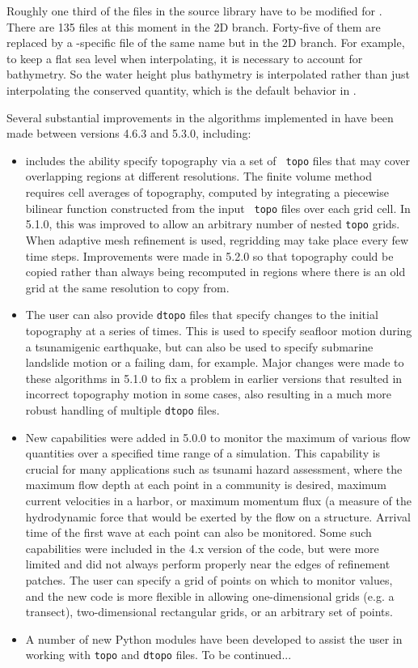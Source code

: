 Roughly one third of the files in the \amrclaw source library
have to be modified for \geoclaw. 
There are 135 files at this moment 
in the \amrclaw 2D branch.
Forty-five of them are replaced by a \geoclaw-specific file of the
same name but in the \geoclaw 2D branch. 
For example, to keep a flat
sea level when interpolating, it is necessary to account for bathymetry.
So the water height plus bathymetry is interpolated rather than just
interpolating the conserved quantity, which is the default behavior in
\amrclaw.

Several substantial improvements in the
algorithms implemented in \geoclaw have been made between versions 4.6.3 and
5.3.0, including:

\begin{itemize} 
\item \geoclaw includes the ability specify topography via a set of {\tt
topo} files that may cover overlapping regions at different resolutions. The
finite volume method requires cell averages of topography, computed by
integrating a piecewise bilinear function constructed from the input {\tt
topo} files over each grid cell.  In 5.1.0, this was improved to 
allow an arbitrary number of nested {\tt topo} grids.
When adaptive mesh refinement is used,
regridding may take place every few time steps.  Improvements were made 
in 5.2.0 so that topography could be copied rather than always being
recomputed in regions where there is an old grid at the same resolution to
copy from.  

\item The user can also provide {\tt dtopo} files that specify changes to
the initial topography at a series of times.  This is used to specify
seafloor motion during a tsunamigenic earthquake, but can also be used to
specify submarine landslide motion or a failing dam, for example.
Major changes were made to these algorithms in 5.1.0 to fix a problem
in earlier versions that resulted in incorrect topography motion in some
cases, also resulting in a much more robust handling of multiple 
{\tt dtopo} files.

\item New capabilities were added in 5.0.0 to monitor the maximum of various
flow quantities over a specified time range of a simulation.  This
capability is crucial for many applications such as tsunami hazard
assessment, where the maximum flow depth at each point in a community is
desired, maximum current velocities in a harbor, or maximum momentum flux (a
measure of the hydrodynamic force that would be exerted by the flow on a
structure.  Arrival time of the first wave at each point can also be
monitored.  Some such capabilities were included in the 4.x version of the code,
but were more limited and did not always perform properly near the edges of
refinement patches.  The user can specify a grid
of points on which to monitor values, and the new code is more flexible in
allowing one-dimensional grids (e.g. a transect), two-dimensional
rectangular grids, or an arbitrary set of points.

\item A number of new Python modules have been developed to assist the user
in working with {\tt topo} and {\tt dtopo} files.  To be continued...

\end{itemize} 

